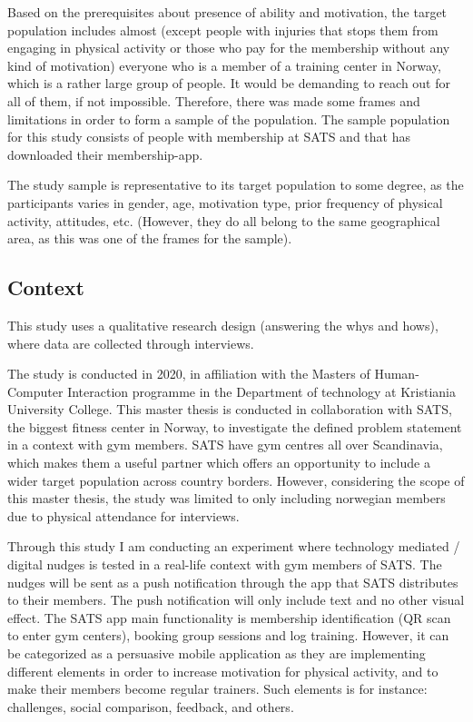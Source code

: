 
Based on the prerequisites about presence of ability and motivation, the target population includes almost (except people with injuries that stops them from engaging in physical activity or those who pay for the membership without any kind of motivation) everyone who is a member of a training center in Norway, which is a rather large group of people. It would be demanding to reach out for all of them, if not impossible. Therefore, there was made some frames and limitations in order to form a sample of the population. The sample population for this study consists of people with membership at SATS and that has downloaded their membership-app. 
 
The study sample is representative to its target population to some degree, as the participants varies in gender, age, motivation type, prior frequency of physical activity, attitudes, etc. (However, they do all belong to the same geographical area, as this was one of the frames for the sample).
 
\subsection{Context}
This study uses a qualitative research design (answering the whys and hows), where data are collected through interviews. 

The study is conducted in 2020, in affiliation with the Masters of Human-Computer Interaction programme in the Department of technology at Kristiania University College. This master thesis is conducted in collaboration with SATS, the biggest fitness center in Norway, to investigate the defined problem statement in a context with gym members. SATS have gym centres all over Scandinavia, which makes them a useful partner which offers an opportunity to include a wider target population across country borders. However, considering the scope of this master thesis, the study was limited to only including norwegian members due to physical attendance for interviews. 

Through this study I am conducting an experiment where technology mediated / digital nudges is tested in a real-life context with gym members of SATS. The nudges will be sent as a push notification through the app that SATS distributes to their members. The push notification will only include text and no other visual effect. The SATS app main functionality is membership identification (QR scan to enter gym centers), booking group sessions and log training. However, it can be categorized as a persuasive mobile application as they are implementing different elements in order to increase motivation for physical activity, and to make their members become regular trainers. Such elements is for instance: challenges, social comparison, feedback, and others. 




